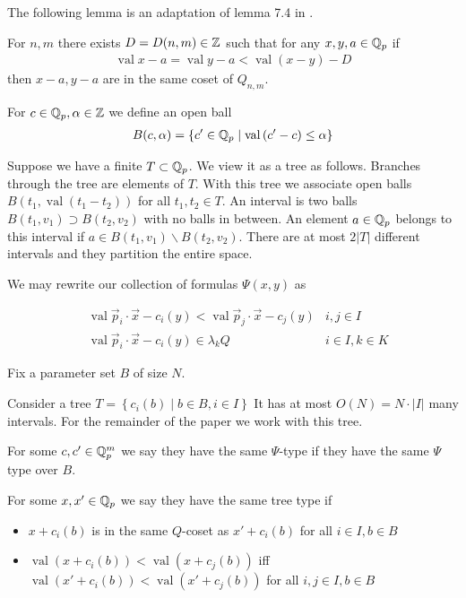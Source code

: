 \documentclass{amsart}
\newcommand{\curly}[1]{\left\{#1\right\}}
\newcommand{\paren}[1]{\left(#1\right)}
\DeclareMathOperator{\val}{val}
\begin{document}
The following lemma is an adaptation of lemma 7.4 in \cite{density}.

\begin{Lemma}
	For $n,m$ there exists $D = D(n,m) \in \mathbb{Z}$ such that for any $x,y,a \in \mathbb{Q}_p$ if
	\begin{align*}
		\val x - a = \val y - a < \val (x - y) - D
	\end{align*}
	then $x - a, y - a$ are in the same coset of $Q_{n,m}$.
\end{Lemma}

\begin{Definition}
	For $c \in \mathbb{Q}_p, \alpha \in \mathbb{Z}$ we define an open ball 
	\begin{align*}
		B(c, \alpha) = \curly{c' \in \Q_p \mid \val \paren{c' - c} \leq \alpha}
	\end{align*}
\end{Definition}

Suppose we have a finite $T \subset \mathbb{Q}_p$.
We view it as a tree as follows.
Branches through the tree are elements of $T$.
With this tree we associate open balls $B(t_1, \val(t_1 - t_2))$ for all $t_1, t_2 \in T$.
An interval is two balls $B(t_1, v_1) \supset B(t_2, v_2)$ with no balls in between.
An element $a \in \mathbb{Q}_p$ belongs to this interval if $a \in B(t_1, v_1) \backslash B(t_2, v_2)$.
There are at most $2|T|$ different intervals and they partition the entire space.

We may rewrite our collection of formulas $\Psi(x, y)$ as

\begin{align*}
	&\val \vec p_i \cdot \vec x - c_i(y) < \val \vec p_j \cdot \vec x - c_j(y) & i, j \in I \\
	&\val \vec p_i \cdot \vec x - c_i(y) \in \lambda_k Q & i \in I , k \in K
\end{align*}

Fix a parameter set $B$ of size $N$.

Consider a tree $T = \curly{c_i(b) \mid b \in B, i \in I}$
It has at most $O(N) = N \cdot |I|$ many intervals.
For the remainder of the paper we work with this tree.

For some $c, c' \in \mathbb{Q}_p^m$ we say they have the same $\Psi$-type if they have the same $\Psi$ type over $B$.

For some $x, x' \in \mathbb{Q}_p$ we say they have the same tree type if
\begin{itemize}
	\item $x + c_i(b)$ is in the same $Q$-coset as $x' + c_i(b)$ for all $i \in I, b \in B$
	\item $\val(x + c_i(b)) < \val(x + c_j(b))$ iff $\val(x' + c_i(b)) < \val(x' + c_j(b))$ for all $i,j \in I, b \in B$
\end{itemize}
 
\end{document}
